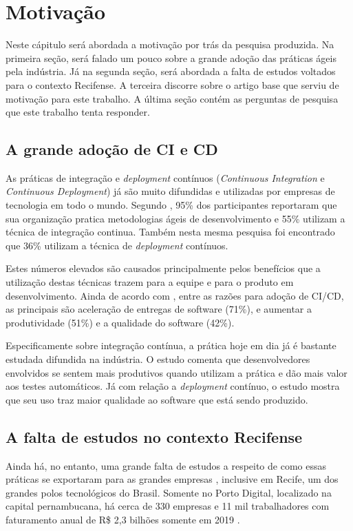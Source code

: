 
\chapter{Motivação}
Neste cápitulo será abordada a motivação por trás da pesquisa produzida. Na primeira seção, será falado um pouco sobre a grande adoção das práticas ágeis pela indústria. Já na segunda seção, será abordada a falta de estudos voltados para o contexto Recifense. A terceira discorre sobre o artigo base que serviu de motivação para este trabalho. A última seção contém as perguntas de pesquisa que este trabalho tenta responder.

\section{A grande adoção de CI e CD}
As práticas de integração e \emph{deployment} contínuos (\emph{Continuous Integration} e \emph{Continuous Deployment}) já são muito difundidas e utilizadas por empresas de tecnologia em todo o mundo. Segundo \cite{stateAgileReport2020}, 95\% dos participantes reportaram que sua organização pratica metodologias ágeis de desenvolvimento e 55\% utilizam a técnica de integração continua. Também nesta mesma pesquisa foi encontrado que 36\% utilizam a técnica de \emph{deployment} contínuos. 

Estes números elevados são causados principalmente pelos benefícios que a utilização destas técnicas trazem para a equipe e para o produto em desenvolvimento. Ainda de acordo com \cite{stateAgileReport2020}, entre as razões para adoção de CI/CD, as principais são aceleração de entregas de software (71\%), e aumentar a produtividade (51\%) e a qualidade do software (42\%). 

Especificamente sobre integração contínua, a prática hoje em dia já é bastante estudada difundida na indústria. O estudo \cite{hilton2016} comenta que desenvolvedores envolvidos se sentem mais produtivos quando utilizam a prática e dão mais valor aos testes automáticos.  Já com relação a \emph{deployment} contínuo, o estudo \cite{savor2015} mostra que seu uso traz maior qualidade ao software que está sendo produzido. 

\section{A falta de estudos no contexto Recifense}

Ainda há, no entanto, uma grande falta de estudos a respeito de como essas práticas se exportaram para as grandes empresas \cite{empiricalStudy2016}, inclusive em Recife, um dos grandes polos tecnológicos do Brasil. Somente no Porto Digital, localizado na capital pernambucana, há cerca de 330 empresas e 11 mil trabalhadores com faturamento anual de R\$ 2,3 bilhões somente em 2019 \cite{portoDigital}.

